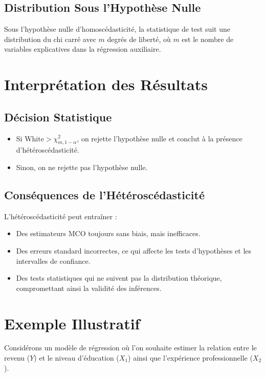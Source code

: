 \documentclass[14pt]{extarticle} %
\theoremstyle{definition}
\theoremstyle{plain}
\begin{document}
\subsection{Distribution Sous l'Hypothèse Nulle}

Sous l'hypothèse nulle d'homoscédasticité, la statistique de test suit une distribution du chi carré avec $m$ degrés de liberté, où $m$ est le nombre de variables explicatives dans la régression auxiliaire.

\section{Interprétation des Résultats}

\subsection{Décision Statistique}

\begin{itemize}
    \item Si $\text{White} > \chi^2_{m, 1-\alpha}$, on rejette l'hypothèse nulle et conclut à la présence d'hétéroscédasticité.
    \item Sinon, on ne rejette pas l'hypothèse nulle.
\end{itemize}

\subsection{Conséquences de l'Hétéroscédasticité}

L'hétéroscédasticité peut entraîner :
\begin{itemize}
    \item Des estimateurs MCO toujours sans biais, mais inefficaces.
    \item Des erreurs standard incorrectes, ce qui affecte les tests d'hypothèses et les intervalles de confiance.
    \item Des tests statistiques qui ne suivent pas la distribution théorique, compromettant ainsi la validité des inférences.
\end{itemize}

\section{Exemple Illustratif}

Considérons un modèle de régression où l'on souhaite estimer la relation entre le revenu ($Y$) et le niveau d'éducation ($X_1$) ainsi que l'expérience professionnelle ($X_2$).
\end{document}
